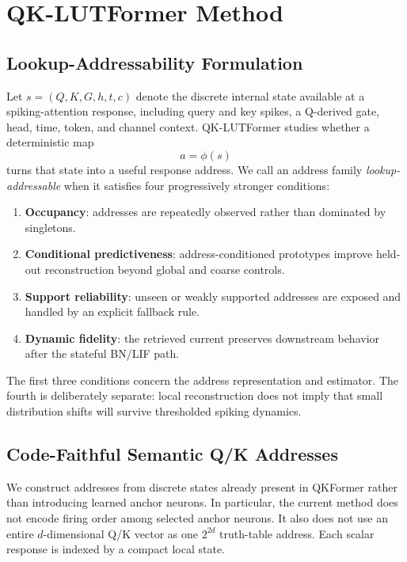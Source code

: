 \section{QK-LUTFormer Method}
\label{sec:method}

\subsection{Lookup-Addressability Formulation}
\label{sec:addressability_formulation}

Let $s=(Q,K,G,h,t,c)$ denote the discrete internal state available at a
spiking-attention response, including query and key spikes, a Q-derived gate,
head, time, token, and channel context. QK-LUTFormer studies whether a
deterministic map
\begin{equation}
  a=\phi(s)
\end{equation}
turns that state into a useful response address. We call an address family
\emph{lookup-addressable} when it satisfies four progressively stronger
conditions:
\begin{enumerate}
  \item \textbf{Occupancy}: addresses are repeatedly observed rather than
  dominated by singletons.
  \item \textbf{Conditional predictiveness}: address-conditioned prototypes
  improve held-out reconstruction beyond global and coarse controls.
  \item \textbf{Support reliability}: unseen or weakly supported addresses are
  exposed and handled by an explicit fallback rule.
  \item \textbf{Dynamic fidelity}: the retrieved current preserves downstream
  behavior after the stateful BN/LIF path.
\end{enumerate}
The first three conditions concern the address representation and estimator.
The fourth is deliberately separate: local reconstruction does not imply that
small distribution shifts will survive thresholded spiking dynamics.

\subsection{Code-Faithful Semantic Q/K Addresses}
\label{sec:qk_address}

We construct addresses from discrete states already present in QKFormer rather
than introducing learned anchor neurons. In particular, the current method
does not encode firing order among selected anchor neurons. It also does not
use an entire $d$-dimensional Q/K vector as one $2^{2d}$ truth-table address.
Each scalar response is indexed by a compact local state.

